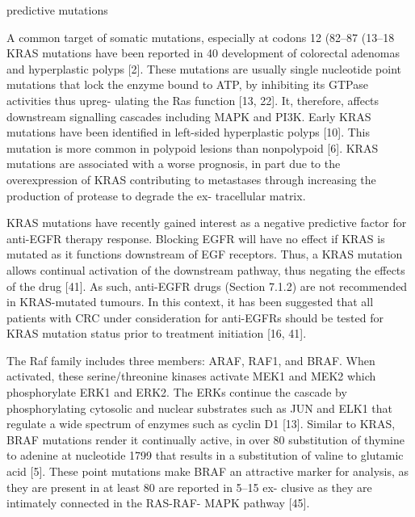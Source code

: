      predictive mutations

      A common target of somatic mutations, especially at codons 12 (82–87%
      (13–18%
      KRAS mutations have been reported in 40%
      development of colorectal adenomas and hyperplastic polyps [2]. These
      mutations are usually single nucleotide point mutations that lock the
      enzyme bound to ATP, by inhibiting its GTPase activities thus upreg-
      ulating the Ras function [13, 22]. It, therefore, affects downstream
      signalling cascades including MAPK and PI3K. Early KRAS mutations have
      been identified in left-sided hyperplastic polyps [10]. This mutation is
      more common in polypoid lesions than nonpolypoid [6]. KRAS mutations are
      associated with a worse prognosis, in part due to the overexpression of
      KRAS contributing to metastases through increasing the production of
      protease to degrade the ex- tracellular matrix.

      KRAS mutations have recently gained interest as a negative predictive
      factor for anti-EGFR therapy response. Blocking EGFR will have no effect
      if KRAS is mutated as it functions downstream of EGF receptors. Thus, a
      KRAS mutation allows continual activation of the downstream pathway, thus
      negating the effects of the drug [41]. As such, anti-EGFR drugs (Section
      7.1.2) are not recommended in KRAS-mutated tumours. In this context, it
      has been suggested that all patients with CRC under consideration for
      anti-EGFRs should be tested for KRAS mutation status prior to treatment
      initiation [16, 41].

      The Raf family includes three members: ARAF, RAF1, and BRAF. When
      activated, these serine/threonine kinases activate MEK1 and MEK2 which
      phosphorylate ERK1 and ERK2. The ERKs continue the cascade by
      phosphorylating cytosolic and nuclear substrates such as JUN and ELK1 that
      regulate a wide spectrum of enzymes such as cyclin D1 [13]. Similar to
      KRAS, BRAF mutations render it continually active, in over 80%
      substitution of thymine to adenine at nucleotide 1799 that results in a
      substitution of valine to glutamic acid [5]. These point mutations make
      BRAF an attractive marker for analysis, as they are present in at least
      80%
      are reported in 5–15%
      ex- clusive as they are intimately connected in the RAS-RAF- MAPK pathway
      [45].

